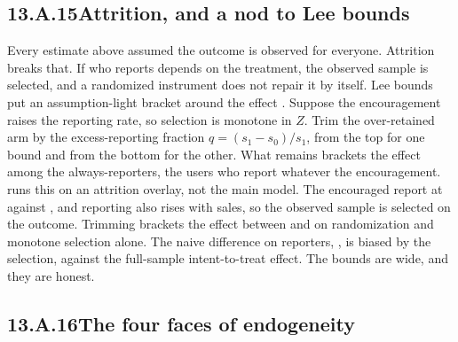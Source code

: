 

\subsection*{13.A.15\quad Attrition, and a nod to Lee bounds}

Every estimate above assumed the outcome is observed for everyone. Attrition breaks that. If who
reports depends on the treatment, the observed sample is selected, and a randomized instrument does
not repair it by itself. Lee bounds put an assumption-light bracket around the effect
\citep{lee2009}. Suppose the encouragement raises the reporting rate, so selection is monotone in
$Z$. Trim the over-retained arm by the excess-reporting fraction $q = (s_1 - s_0)/s_1$, from the top
for one bound and from the bottom for the other. What remains brackets the effect among the
always-reporters, the users who report whatever the encouragement.  runs this on an
attrition overlay, not the main model. The encouraged report at \pc{\nbElevenLeeSone} against
\pc{\nbElevenLeeSzero}, and reporting also rises with sales, so the observed sample is selected on
the outcome. Trimming \pc{\nbElevenLeeTrim} brackets the effect between \eur{\nbElevenLeeLo} and
\eur{\nbElevenLeeHi} on randomization and monotone selection alone. The naive difference on
reporters, \eur{\nbElevenLeeNaive}, is biased by the selection, against the \eur{\nbElevenLeeItt}
full-sample intent-to-treat effect. The bounds are wide, and they are honest.



\subsection*{13.A.16\quad The four faces of endogeneity}

